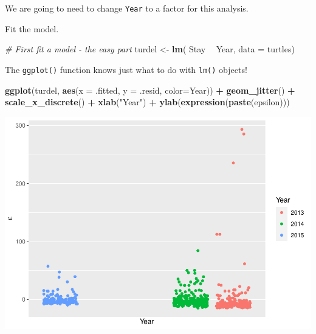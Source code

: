 \documentclass[
]{book}
\newenvironment{Shaded}{\begin{snugshade}}{\end{snugshade}}
\newcommand{\CommentTok}[1]{\textcolor[rgb]{0.56,0.35,0.01}{\textit{#1}}}
\newcommand{\DataTypeTok}[1]{\textcolor[rgb]{0.13,0.29,0.53}{#1}}
\newcommand{\DecValTok}[1]{\textcolor[rgb]{0.00,0.00,0.81}{#1}}
\newcommand{\KeywordTok}[1]{\textcolor[rgb]{0.13,0.29,0.53}{\textbf{#1}}}
\newcommand{\NormalTok}[1]{#1}
\newcommand{\OperatorTok}[1]{\textcolor[rgb]{0.81,0.36,0.00}{\textbf{#1}}}
\newcommand{\StringTok}[1]{\textcolor[rgb]{0.31,0.60,0.02}{#1}}
\begin{document}
We are going to need to change \texttt{Year} to a factor for this analysis.

\begin{Shaded}
\end{Shaded}

Fit the model.

\begin{Shaded}
\begin{Highlighting}[]
\CommentTok{# First fit a model - the easy part}
\NormalTok{turdel <-}\StringTok{ }\KeywordTok{lm}\NormalTok{( Stay }\OperatorTok{~}\StringTok{ }\NormalTok{Year, }\DataTypeTok{data =}\NormalTok{ turtles) }
\end{Highlighting}
\end{Shaded}

The \texttt{ggplot()} function knows just what to do with \texttt{lm()} objects!

\begin{Shaded}
\begin{Highlighting}[]
\KeywordTok{ggplot}\NormalTok{(turdel, }\KeywordTok{aes}\NormalTok{(}\DataTypeTok{x =}\NormalTok{ .fitted, }\DataTypeTok{y =}\NormalTok{ .resid, }\DataTypeTok{color=}\NormalTok{Year)) }\OperatorTok{+}\StringTok{ }
\StringTok{  }\KeywordTok{geom_jitter}\NormalTok{() }\OperatorTok{+}
\StringTok{  }\KeywordTok{scale_x_discrete}\NormalTok{() }\OperatorTok{+}
\StringTok{  }\KeywordTok{xlab}\NormalTok{(}\StringTok{"Year"}\NormalTok{) }\OperatorTok{+}\StringTok{ }
\StringTok{  }\KeywordTok{ylab}\NormalTok{(}\KeywordTok{expression}\NormalTok{(}\KeywordTok{paste}\NormalTok{(epsilon)))}
\end{Highlighting}
\end{Shaded}

\includegraphics{worstr_files/figure-latex/unnamed-chunk-236-1.pdf}
\end{document}
